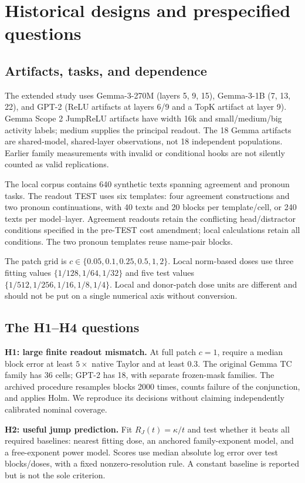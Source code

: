 \section{Historical designs and prespecified questions}
\subsection{Artifacts, tasks, and dependence}
The extended study uses Gemma-3-270M (layers 5, 9, 15), Gemma-3-1B (7, 13, 22), and GPT-2 (ReLU artifacts at layers 6/9 and a TopK artifact at layer 9). Gemma Scope 2 JumpReLU artifacts have width 16k and small/medium/big activity labels; medium supplies the principal readout. The 18 Gemma artifacts are shared-model, shared-layer observations, not 18 independent populations. Earlier family measurements with invalid or conditional hooks are not silently counted as valid replications.

The local corpus contains 640 synthetic texts spanning agreement and pronoun tasks. The readout TEST uses six templates: four agreement constructions and two pronoun continuations, with 40 texts and 20 blocks per template/cell, or 240 texts per model--layer. Agreement readouts retain the conflicting head/distractor conditions specified in the pre-TEST cost amendment; local calculations retain all conditions. The two pronoun templates reuse name-pair blocks.

The patch grid is $c\in\{0.05,0.1,0.25,0.5,1,2\}$. Local norm-based doses use three fitting values $\{1/128,1/64,1/32\}$ and five test values $\{1/512,1/256,1/16,1/8,1/4\}$. Local and donor-patch dose units are different and should not be put on a single numerical axis without conversion.

\subsection{The H1--H4 questions}
\textbf{H1: large finite readout mismatch.} At full patch $c=1$, require a median block error at least $5\times$ native Taylor and at least $0.3$. The original Gemma TC family has 36 cells; GPT-2 has 18, with separate frozen-mask families. The archived procedure resamples blocks 2000 times, counts failure of the conjunction, and applies Holm. We reproduce its decisions without claiming independently calibrated nominal coverage.

\textbf{H2: useful jump prediction.} Fit $R_J(t)=\kappa/t$ and test whether it beats all required baselines: nearest fitting dose, an anchored family-exponent model, and a free-exponent power model. Scores use median absolute log error over test blocks/doses, with a fixed nonzero-resolution rule. A constant baseline is reported but is not the sole criterion.

